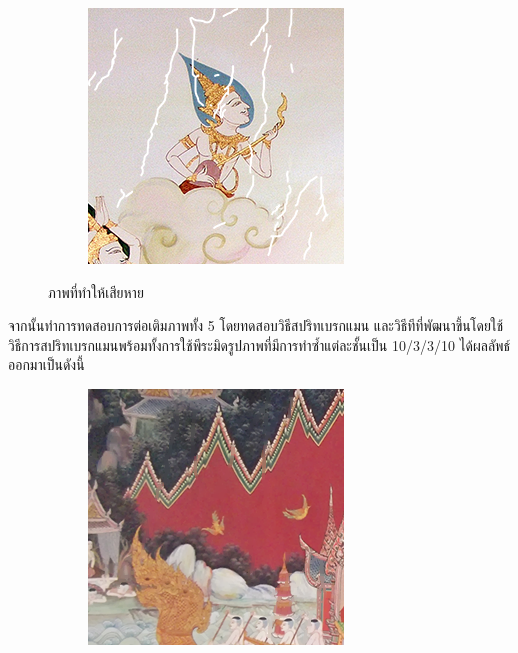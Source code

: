\documentclass[hidelinks, a4paper,12pt]{article}
\numberwithin{equation}{section}							%
\numberwithin{equation}{section}
\begin{document}
{\begin{figure}[H]
\begin{subfigure}{0.4\linewidth}
		\includegraphics[width=0.8\linewidth]{images/thaiart/case05-toinpaint.png}			
	\end{subfigure}
	\caption{ภาพที่ทำให้เสียหาย}
\end{figure}
	 \hspace{1cm} จากนั้นทำการทดสอบการต่อเติมภาพทั้ง 5 โดยทดสอบวิธีสปริทเบรกแมน และวิธีทีที่พัฒนาขึ้นโดยใช้วิธีการสปริทเบรกแมนพร้อมทั้งการใช้พีระมิดรูปภาพที่มีการทำซ้ำแต่ละชั้นเป็น 10/3/3/10  ได้ผลลัพธ์ออกมาเป็นดังนี้
	\begin{figure}[H]
		\centering
		\begin{subfigure}{0.4\linewidth}
			\centering
			\includegraphics[width=0.8\linewidth]{images/result_ex4/splitbergman_case01.png}

\end{subfigure}
\end{figure}}
\end{document}
